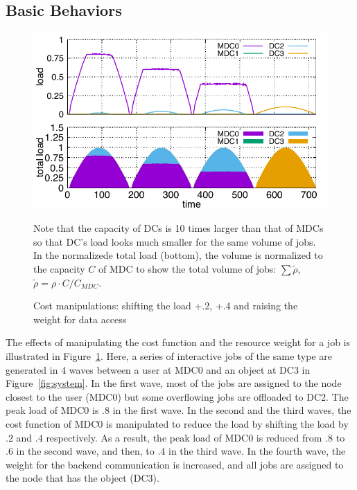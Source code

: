 \subsection{Basic Behaviors}

\begin{figure}[tb]
  \begin{center}
    \includegraphics[width=1.0\columnwidth]{lowering.pdf}
    \vspace{-2.0ex}
    \caption{Cost manipulations: shifting the load +.2,
      +.4 and raising the weight for data access}
    \smallskip
    \raggedright
    \small
    Note that the capacity of DCs is 10 times larger than that of MDCs
    so that DC's load looks much smaller for the same volume of jobs.
    In the normalizede total load (bottom), the volume is normalized
    to the capacity $C$ of MDC to show the total volume of jobs:
    $\sum \tilde{\rho}$, \:$\tilde{\rho} = \rho \cdot C/C_{MDC}$.
    \label{fig:lowering}
  \end{center}
\end{figure}

The effects of manipulating the cost function and the resource weight
for a job is illustrated in Figure~\ref{fig:lowering}.
Here, a series of interactive jobs of the same type are generated in
4 waves between a user at MDC0 and an object at DC3 in
Figure~\ref{fig:system}.
In the first wave,  most of the jobs are assigned to the node closest
to the user (MDC0) but some overflowing jobs are offloaded to DC2.
The peak load of MDC0 is $.8$ in the first wave.
In the second and the third waves, the cost function of MDC0 is
manipulated to reduce the load by shifting the load by $.2$ and $.4$
respectively. As a result, the peak load of MDC0 is
reduced from $.8$ to $.6$ in the second wave, and then, to $.4$ in the
third wave.
In the fourth wave, the weight for the backend communication is
increased, and all jobs are assigned to the node that has the object
(DC3).

